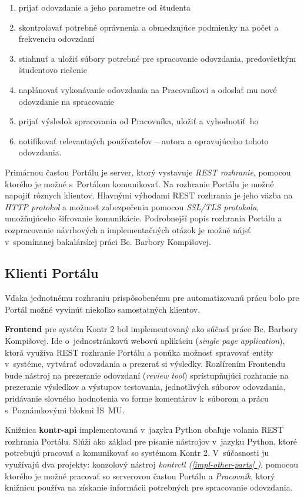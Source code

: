 \documentclass[
  digital, %
  oneside, %
  table,   %
  lof,     %
  lot,   %
]{fithesis3}
\newcommand*{\fullref}[1]{\hyperref[{#1}]{\ref*{#1} \nameref*{#1}}}
\begin{document}
\begin{enumerate}
  \item prijať odovzdanie a jeho parametre od študenta
  \item skontrolovať potrebné oprávnenia a obmedzujúce podmienky na počet a frekvenciu odovzdaní
  \item stiahnuť a uložiť súbory potrebné pre spracovanie odovzdania, predovšetkým študentovo riešenie
  \item naplánovať vykonávanie odovzdania na Pracovníkovi a odoslať mu nové odovzdanie na spracovanie
  \item prijať výsledok spracovania od Pracovníka, uložiť a vyhodnotiť~ho
  \item notifikovať relevantných používateľov -- autora a opravujúceho tohoto odovzdania.
\end{enumerate}

Primárnou časťou Portálu je server, ktorý vystavuje \emph{REST rozhranie}\cite{fielding}, pomocou ktorého je možné s~Portálom komunikovať. Na rozhranie Portálu je možné napojiť rôznych klientov. Hlavnými výhodami REST rozhrania je jeho väzba na \emph{HTTP protokol}\cite{RFC2616} a možnosť zabezpečenia pomocou \emph{SSL/TLS protokolu}\cite{RFC8446}, umožňujúceho šifrovanie komunikácie. Podrobnejší popis rozhrania Portálu a rozpracovanie návrhových a implementačných otázok je možné nájsť v~spomínanej bakalárskej práci Bc. Barbory Kompišovej\cite{kontr-portal}.

\subsection{Klienti Portálu}
Vďaka jednotnému rozhraniu prispôsobenému pre automatizovanú prácu bolo pre Portál možné vyvinúť niekoľko samostatných klientov. 

\textbf{Frontend} pre systém Kontr 2 bol implementovaný ako súčasť práce Bc. Barbory Kompišovej\cite{kontr-portal}. Ide o~jednostránkovú webovú aplikáciu (\emph{single page application}), ktorá využíva REST rozhranie Portálu a ponúka možnosť spravovať entity v~systéme, vytvárať odovzdania a prezerať si výsledky. Rozšírením Frontendu bude nástroj na prezeranie odovzdaní (\emph{review tool}) sprístupňujúci rozhranie na prezeranie výsledkov a výstupov testovania, jednotlivých súborov odovzdania, pridávanie slovného hodnotenia vo forme komentárov k~súborom a prácu s~Poznámkovými blokmi IS~MU. 

Knižnica \textbf{kontr-api} implementovaná v~jazyku Python obaľuje volania REST rozhrania Portálu. Slúži ako základ pre písanie nástrojov v~jazyku Python, ktoré potrebujú pracovať a komunikovať so systémom Kontr 2. V~súčasnosti ju využívajú dva projekty: konzolový nástroj \emph{kontrctl (\fullref{impl-other-parts})}, pomocou ktorého je možné pracovať so serverovou častou Portálu a \emph{Pracovník}, ktorý knižnicu používa na získanie informácii potrebných pre spracovanie odovzdania.
\end{document}
